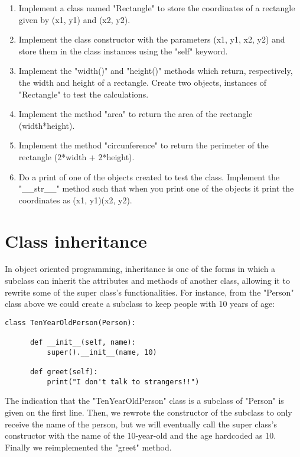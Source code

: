 \begin{enumerate}

\item Implement a class named "Rectangle" to store the coordinates of a rectangle given by (x1, y1) and (x2, y2).

\item Implement the class constructor with the parameters (x1, y1, x2, y2) and store them in the class instances using the "self" keyword.

\item Implement the "width()" and "height()" methods which return, respectively, the width and height of a rectangle. Create two objects, instances of "Rectangle" to test the calculations.

\item Implement the method "area" to return the area of the rectangle (width*height).

\item Implement the method "circunference" to return the perimeter of the rectangle (2*width + 2*height).

\item Do a print of one of the objects created to test the class. Implement the "\_\_str\_\_" method such that when you print one of the objects it print the coordinates as (x1, y1)(x2, y2).

\end{enumerate}

\section{Class inheritance}

In object oriented programming, inheritance is one of the forms in which a subclass can inherit the attributes and methods of another class, allowing it to rewrite some of the super class's functionalities. For instance, from the "Person" class above we could create a subclass to keep people with 10 years of age:

\begin{lstlisting}
class TenYearOldPerson(Person):

      def __init__(self, name):
          super().__init__(name, 10)
          
      def greet(self):
          print("I don't talk to strangers!!")
\end{lstlisting}

The indication that the "TenYearOldPerson" class is a subclass of "Person" is given on the first line. Then, we rewrote the constructor of the subclass to only receive the name of the person, but we will eventually call the super class's constructor with the name of the 10-year-old and the age hardcoded as 10. Finally we reimplemented the "greet" method.

